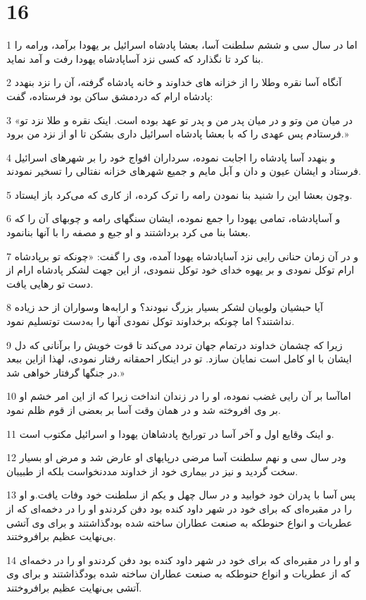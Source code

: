 \chapter{16}

\par 1 اما در سال سی و ششم سلطنت آسا، بعشا پادشاه اسرائیل بر یهودا برآمد، ورامه را بنا کرد تا نگذارد که کسی نزد آساپادشاه یهودا رفت و آمد نماید.
\par 2 آنگاه آسا نقره وطلا را از خزانه های خداوند و خانه پادشاه گرفته، آن را نزد بنهدد پادشاه ارام که دردمشق ساکن بود فرستاده، گفت:
\par 3 «در میان من وتو و در میان پدر من و پدر تو عهد بوده است. اینک نقره و طلا نزد تو فرستادم پس عهدی را که با بعشا پادشاه اسرائیل داری بشکن تا او از نزد من برود.»
\par 4 و بنهدد آسا پادشاه را اجابت نموده، سرداران افواج خود را بر شهرهای اسرائیل فرستاد و ایشان عیون و دان و آبل مایم و جمیع شهرهای خزانه نفتالی را تسخیر نمودند.
\par 5 وچون بعشا این را شنید بنا نمودن رامه را ترک کرده، از کاری که می‌کرد باز ایستاد.
\par 6 و آساپادشاه، تمامی یهودا را جمع نموده، ایشان سنگهای رامه و چوبهای آن را که بعشا بنا می کرد برداشتند و او جبع و مصفه را با آنها بنانمود.
\par 7 و در آن زمان حنانی رایی نزد آساپادشاه یهودا آمده، وی را گفت: «چونکه تو برپادشاه ارام توکل نمودی و بر یهوه خدای خود توکل ننمودی، از این جهت لشکر پادشاه ارام از دست تو رهایی یافت.
\par 8 آیا حبشیان ولوبیان لشکر بسیار بزرگ نبودند؟ و ارابه‌ها وسواران از حد زیاده نداشتند؟ اما چونکه برخداوند توکل نمودی آنها را به‌دست توتسلیم نمود.
\par 9 زیرا که چشمان خداوند درتمام جهان تردد می‌کند تا قوت خویش را برآنانی که دل ایشان با او کامل است نمایان سازد. تو در اینکار احمقانه رفتار نمودی، لهذا ازاین ببعد در جنگها گرفتار خواهی شد.»
\par 10 اماآسا بر آن رایی غضب نموده، او را در زندان انداخت زیرا که از این امر خشم او بر وی افروخته شد و در همان وقت آسا بر بعضی از قوم ظلم نمود.
\par 11 و اینک وقایع اول و آخر آسا در تورایخ پادشاهان یهودا و اسرائیل مکتوب است.
\par 12 ودر سال سی و نهم سلطنت آسا مرضی درپایهای او عارض شد و مرض او بسیار سخت گردید و نیز در بیماری خود از خداوند مددنخواست بلکه از طبیبان.
\par 13 پس آسا با پدران خود خوابید و در سال چهل و یکم از سلطنت خود وفات یافت.و او را در مقبره‌ای که برای خود در شهر داود کنده بود دفن کردندو او را در دخمه‌ای که از عطریات و انواع حنوطکه به صنعت عطاران ساخته شده بودگذاشتند و برای وی آتشی بی‌نهایت عظیم برافروختند.
\par 14 و او را در مقبره‌ای که برای خود در شهر داود کنده بود دفن کردندو او را در دخمه‌ای که از عطریات و انواع حنوطکه به صنعت عطاران ساخته شده بودگذاشتند و برای وی آتشی بی‌نهایت عظیم برافروختند.
 
